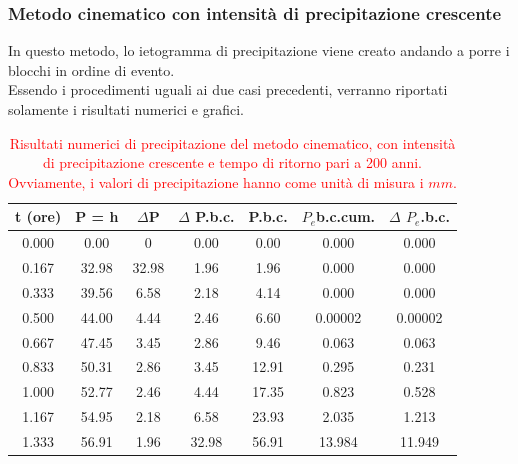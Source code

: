 \subsubsection{Metodo cinematico con intensità di precipitazione crescente}
In questo metodo, lo ietogramma di precipitazione viene creato andando a porre i blocchi in ordine di evento.\\
Essendo i procedimenti uguali ai due casi precedenti, verranno riportati solamente i risultati numerici e grafici.
\begin{table}[H] \centering
    \caption{\textcolor{red}{Risultati numerici di precipitazione del metodo cinematico, con intensità di precipitazione crescente e tempo di ritorno pari a 200 anni. Ovviamente, i valori di precipitazione hanno come unità di misura i $mm$.}}
    \begin{tabular}{ccccccc}
        \toprule
    t (ore)   & P = h & $\Delta$P & $\Delta$ P.b.c. & P.b.c. & $P_e$b.c.cum. & $\Delta$ $P_e$.b.c. \\
    \midrule
    0.000     & 0.00                 & 0                    & 0.00              & 0.00                & 0.000                & 0.000              \\
    0.167     & 32.98                & 32.98                & 1.96              & 1.96                & 0.000                & 0.000              \\
    0.333 & 39.56                & 6.58                 & 2.18              & 4.14                & 0.000                & 0.000              \\
    0.500     & 44.00                & 4.44                 & 2.46              & 6.60                & 0.00002              & 0.00002            \\
    0.667     & 47.45                & 3.45                 & 2.86              & 9.46                & 0.063                & 0.063              \\
    0.833     & 50.31                & 2.86                 & 3.45              & 12.91               & 0.295                & 0.231              \\
    1.000     & 52.77                & 2.46                 & 4.44              & 17.35               & 0.823                & 0.528              \\
    1.167     & 54.95                & 2.18                 & 6.58              & 23.93               & 2.035                & 1.213              \\
    1.333     & 56.91                & 1.96                 & 32.98             & 56.91               & 13.984               & 11.949            \\
    \bottomrule
    \end{tabular}
    \end{table}

